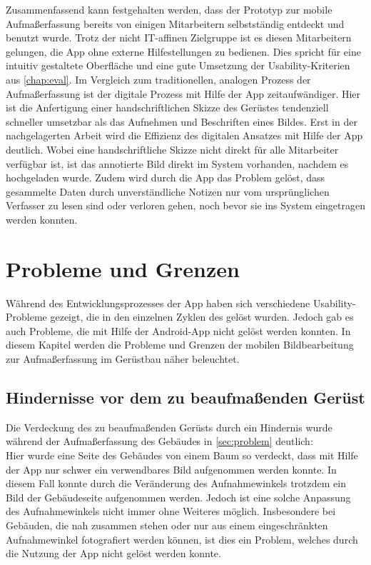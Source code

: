 Zusammenfassend kann festgehalten werden, dass der Prototyp zur mobile Aufmaßerfassung bereits von einigen Mitarbeitern selbstständig entdeckt und benutzt wurde.
Trotz der nicht IT-affinen Zielgruppe ist es diesen Mitarbeitern gelungen, die App ohne externe Hilfestellungen zu bedienen.
Dies spricht für eine intuitiv gestaltete Oberfläche und eine gute Umsetzung der Usability-Kriterien aus \autoref{chap:eval}.
Im Vergleich zum traditionellen, analogen Prozess der Aufmaßerfassung ist der digitale Prozess mit Hilfe der App zeitaufwändiger.
Hier ist die Anfertigung einer handschriftlichen Skizze des Gerüstes tendenziell schneller umsetzbar als das Aufnehmen und Beschriften eines Bildes.
Erst in der nachgelagerten Arbeit wird die Effizienz des digitalen Ansatzes mit Hilfe der App deutlich.
Wobei eine handschriftliche Skizze nicht direkt für alle Mitarbeiter verfügbar ist, ist das annotierte Bild direkt im System vorhanden, nachdem es hochgeladen wurde.
Zudem wird durch die App das Problem gelöst, dass gesammelte Daten durch unverständliche Notizen nur vom ursprünglichen Verfasser zu lesen sind oder verloren gehen, noch bevor sie ins System eingetragen werden konnten.

\section{Probleme und Grenzen}
Während des Entwicklungsprozesses der App haben sich verschiedene Usability-Probleme gezeigt, die in den einzelnen Zyklen des \hcdp{} gelöst wurden.
Jedoch gab es auch Probleme, die mit Hilfe der Android-App nicht gelöst werden konnten.
In diesem Kapitel werden die Probleme und Grenzen der mobilen Bildbearbeitung zur Aufmaßerfassung im Gerüstbau näher beleuchtet.

\subsection{Hindernisse vor dem zu beaufmaßenden Gerüst}
Die Verdeckung des zu beaufmaßenden Gerüsts durch ein Hindernis wurde während der Aufmaßerfassung des Gebäudes in \autoref{sec:problem} deutlich: \\
Hier wurde eine Seite des Gebäudes von einem Baum so verdeckt, dass mit Hilfe der App nur schwer ein verwendbares Bild aufgenommen werden konnte.
In diesem Fall konnte durch die Veränderung des Aufnahmewinkels trotzdem ein Bild der Gebäudeseite aufgenommen werden.
Jedoch ist eine solche Anpassung des Aufnahmewinkels nicht immer ohne Weiteres möglich.
Insbesondere bei Gebäuden, die nah zusammen stehen oder nur aus einem eingeschränkten Aufnahmewinkel fotografiert werden können, ist dies ein Problem, welches durch die Nutzung der App nicht gelöst werden konnte.

